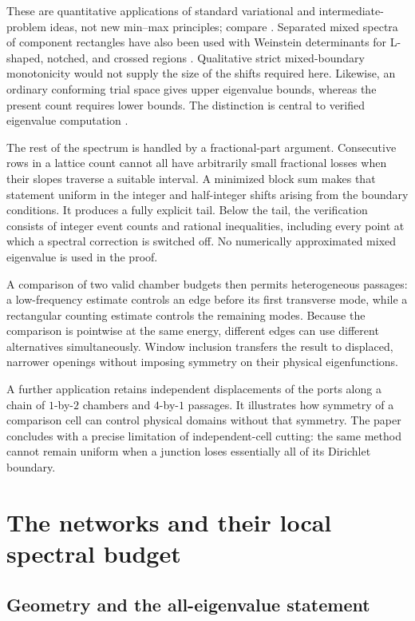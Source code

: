 \documentclass[11pt,reqno]{amsart}
\numberwithin{equation}{section}
\begin{document}
These are quantitative applications of standard variational and
intermediate-problem ideas, not new min--max principles; compare
\cite{FoxStadter,WeinsteinStenger}. Separated mixed spectra of
component rectangles have also been used with Weinstein determinants
for L-shaped, notched, and crossed regions \cite{Hashimoto}.
Qualitative strict mixed-boundary
monotonicity \cite{LotoreichikRohleder} would not supply the size of
the shifts required here. Likewise, an ordinary conforming trial
space gives upper eigenvalue bounds, whereas the present count
requires lower bounds. The distinction is central to verified
eigenvalue computation \cite{VejchodskySebestova}.

The rest of the spectrum is handled by a fractional-part argument.
Consecutive rows in a lattice count cannot all have arbitrarily
small fractional losses when their slopes traverse a suitable
interval. A minimized block sum makes that statement uniform in
the integer and half-integer shifts arising from the boundary
conditions. It produces a fully explicit tail. Below the tail,
the verification consists of integer event counts and rational
inequalities, including every point at which a spectral correction
is switched off. No numerically approximated mixed eigenvalue is
used in the proof.

A comparison of two valid chamber budgets then permits heterogeneous
passages: a low-frequency estimate controls an edge before its first
transverse mode, while a rectangular counting estimate controls the
remaining modes. Because the comparison is pointwise at the same
energy, different edges can use different alternatives simultaneously.
Window inclusion transfers the result to displaced, narrower
openings without imposing symmetry on their physical eigenfunctions.

A further application retains independent displacements of the
ports along a chain of $1$-by-$2$ chambers and $4$-by-$1$ passages.
It illustrates how symmetry of a comparison cell can control
physical domains without that symmetry. The paper concludes with
a precise limitation of independent-cell cutting: the same method
cannot remain uniform when a junction loses essentially all of its
Dirichlet boundary.

\section{The networks and their local spectral budget}\label{sec:geometry}

\subsection{Geometry and the all-eigenvalue statement}
\end{document}

